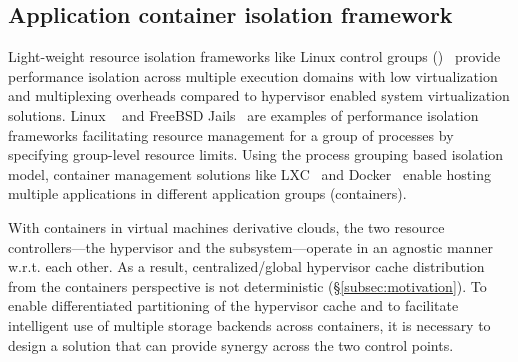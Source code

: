 \subsection{Application container isolation framework}
%
Light-weight resource isolation frameworks like Linux control 
groups (\cgroup)~\cite{cgroup} provide performance isolation 
across multiple execution domains with low virtualization 
and multiplexing overheads compared to hypervisor enabled 
system virtualization solutions.
%
Linux \cgroup~\cite{cgroup} and FreeBSD Jails~\cite{jail} are examples
of performance isolation frameworks facilitating resource management 
for a group of processes by specifying group-level resource limits.
%
%
Using the process grouping based isolation model, container management
solutions like LXC~\cite{lxc} and Docker~\cite{docker} enable hosting
multiple applications in different application groups (containers).
%

With containers in virtual machines derivative clouds, 
the two resource controllers---the hypervisor and the \cgroup{} subsystem---operate 
in an agnostic manner w.r.t. each other.
%
As a result, centralized/global hypervisor cache 
distribution from the containers perspective is not 
deterministic (\S\ref{subsec:motivation}).
%
To enable differentiated partitioning of the hypervisor cache and 
to facilitate intelligent use of multiple storage backends across 
containers, it is necessary to design a
solution that can provide synergy across the two control points.
%

